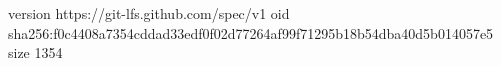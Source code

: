 version https://git-lfs.github.com/spec/v1
oid sha256:f0c4408a7354cddad33edf0f02d77264af99f71295b18b54dba40d5b014057e5
size 1354
